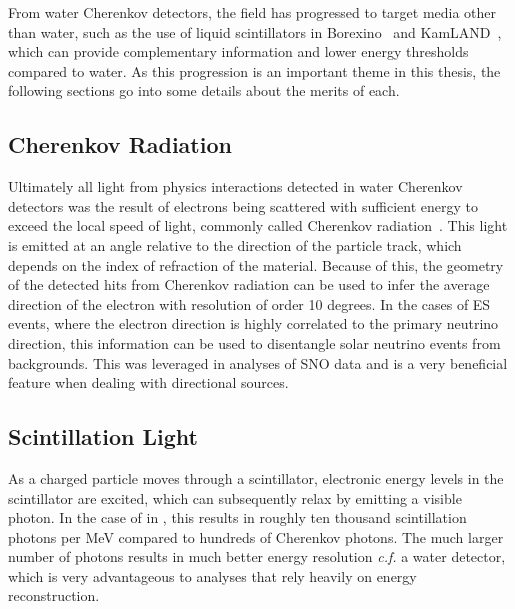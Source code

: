 From water Cherenkov detectors, the field has progressed to target media other than water, such as the use of liquid scintillators in Borexino~\cite{borexino} and KamLAND~\cite{kamland}, which can provide complementary information and lower energy thresholds compared to water.
As this progression is an important theme in this thesis, the following sections go into some details about the merits of each.

\subsection{Cherenkov Radiation}

Ultimately all light from physics interactions detected in water Cherenkov detectors was the result of electrons being scattered with sufficient energy to exceed the local speed of light, commonly called Cherenkov radiation~\cite{cherenkov}.
This light is emitted at an angle relative to the direction of the particle track, which depends on the index of refraction of the material.
Because of this, the geometry of the detected hits from Cherenkov radiation can be used to infer the average direction of the electron with resolution of order 10 degrees.
In the cases of ES events, where the electron direction is highly correlated to the primary neutrino direction, this information can be used to disentangle solar neutrino events from backgrounds.
This was leveraged in analyses of SNO data and is a very beneficial feature when dealing with directional sources.

\subsection{Scintillation Light}

As a charged particle moves through a scintillator, electronic energy levels in the scintillator are excited, which can subsequently relax by emitting a visible photon.
In the case of {\labppo} in {\snop}, this results in roughly ten thousand scintillation photons per MeV compared to hundreds of Cherenkov photons.
The much larger number of photons results in much better energy resolution \textit{c.f.} a water detector, which is very advantageous to analyses that rely heavily on energy reconstruction.

